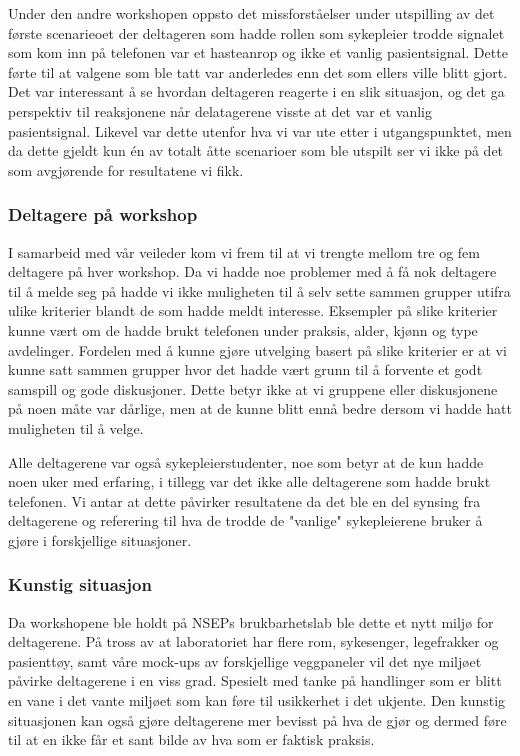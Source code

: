 \noindent
Under den andre workshopen oppsto det missforståelser under utspilling av det første scenarieoet der deltageren som hadde rollen som sykepleier trodde signalet som kom inn på telefonen var et hasteanrop og ikke et vanlig pasientsignal. Dette førte til at valgene som ble tatt var anderledes enn det som ellers ville blitt gjort. Det var interessant å se hvordan deltageren reagerte i en slik situasjon, og det ga perspektiv til reaksjonene når delatagerene visste at det var et vanlig pasientsignal. Likevel var dette utenfor hva vi var ute etter i utgangspunktet, men da dette gjeldt kun én av totalt åtte scenarioer som ble utspilt ser vi ikke på det som avgjørende for resultatene vi fikk. 

\subsubsection{Deltagere på workshop}
I samarbeid med vår veileder kom vi frem til at vi trengte mellom tre og fem deltagere på hver workshop. Da vi hadde noe problemer med å få nok deltagere til å melde seg på hadde vi ikke muligheten til å selv sette sammen grupper utifra ulike kriterier blandt de som hadde meldt interesse. Eksempler på slike kriterier kunne vært om de hadde brukt telefonen under praksis, alder, kjønn og type avdelinger. Fordelen med å kunne gjøre utvelging basert på slike kriterier er at vi kunne satt sammen grupper hvor det hadde vært grunn til å forvente et godt samspill og gode diskusjoner. Dette betyr ikke at vi gruppene eller diskusjonene på noen måte var dårlige, men at de kunne blitt ennå bedre dersom vi hadde hatt muligheten til å velge.

\noindent
Alle deltagerene var også sykepleierstudenter, noe som betyr at de kun hadde noen uker med erfaring, i tillegg var det ikke alle deltagerene som hadde brukt telefonen. Vi antar at dette påvirker resultatene da det ble en del synsing fra deltagerene og referering til hva de trodde de "vanlige" sykepleierene bruker å gjøre i forskjellige situasjoner.  


\subsubsection{Kunstig situasjon}
Da workshopene ble holdt på NSEPs brukbarhetslab ble dette et nytt miljø for deltagerene. På tross av at laboratoriet har flere rom, sykesenger, legefrakker og pasienttøy, samt våre mock-ups av forskjellige veggpaneler vil det nye miljøet påvirke deltagerene i en viss grad. Spesielt med tanke på handlinger som er blitt en vane i det vante miljøet som kan føre til usikkerhet i det ukjente. Den kunstig situasjonen kan også gjøre deltagerene mer bevisst på hva de gjør og dermed føre til at en ikke får et sant bilde av hva som er faktisk praksis. 


